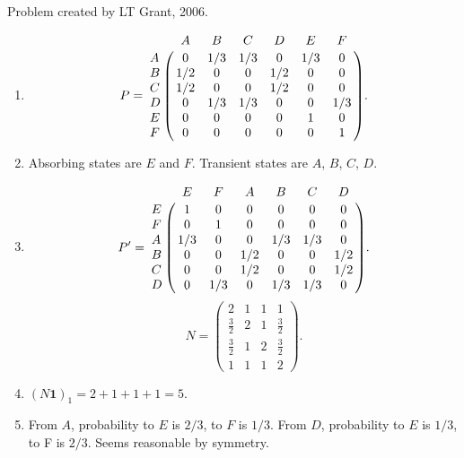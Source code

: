 \documentclass[12pt]{article}
\begin{document}
\begin{solution}
    Problem created by LT Grant, 2006.
    \begin{enumerate}[label=(\alph*)]
    \item
        \[
            P = \bordermatrix{ & A & B & C & D & E & F \cr
            A & 0 & 1/3 & 1/3 & 0 & 1/3 & 0 \cr
            B & 1/2 & 0 & 0 & 1/2 & 0 & 0 \cr
            C & 1/2 & 0 & 0 & 1/2 & 0 & 0 \cr
            D & 0 & 1/3 & 1/3 & 0 & 0 & 1/3 \cr
            E & 0 & 0 & 0 & 0 & 1 & 0 \cr
            F & 0 & 0 & 0 & 0 & 0 & 1 }.
        \]
    \item
        Absorbing states are \( E \) and \( F \).  Transient states are \(
        A \), \( B \), \( C \), \( D \).
    \item
        \[
            P' = \bordermatrix{ & E & F & A & B & C & D \cr
            E & 1 & 0 & 0 & 0 & 0 & 0 \cr
            F & 0 & 1 & 0 & 0 & 0 & 0 \cr
            A & 1/3 & 0 & 0 & 1/3 & 1/3 & 0 \cr
            B & 0 & 0 & 1/2 & 0 & 0 & 1/2 \cr
            C & 0 & 0 & 1/2 & 0 & 0 & 1/2 \cr
            D & 0 & 1/3 & 0 & 1/3 & 1/3 & 0 \cr
            }.
        \]
        \[
            N =
            \begin{pmatrix}
                2 & 1 & 1 & 1\\
                \frac{3}{2} & 2 & 1 & \frac{3}{2}\\
                \frac{3}{2} & 1 & 2 & \frac{3}{2}\\
                1 & 1 & 1 & 2
            \end{pmatrix}
            .
        \]
    \item
        \( (N \mathbf{1})_{1} = 2 + 1 + 1 + 1 = 5 \).
    \item
        From \( A \), probability to \( E \) is \( 2/3 \), to \( F \) is
        \( 1/3 \).  From \( D \), probability to \( E \) is \( 1/3 \),
        to F is \( 2/3 \).  Seems reasonable by symmetry.
\end{enumerate}
\end{solution}
\end{document}

